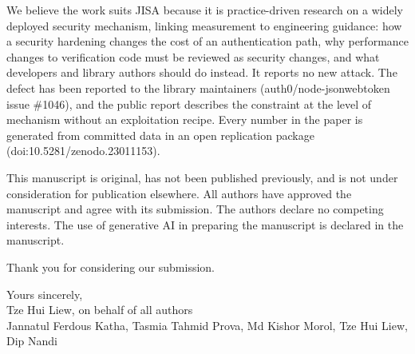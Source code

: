 \documentclass[11pt,a4paper]{article}
\begin{document}
We believe the work suits JISA because it is practice-driven research on a
widely deployed security mechanism, linking measurement to engineering
guidance: how a security hardening changes the cost of an authentication path,
why performance changes to verification code must be reviewed as security
changes, and what developers and library authors should do instead. It reports no new
attack. The defect has been reported to the library maintainers
(auth0/node-jsonwebtoken issue \#1046), and the public report describes the
constraint at the level of mechanism without an exploitation recipe. Every
number in the paper is generated from committed data in an open replication
package (doi:10.5281/zenodo.23011153).

This manuscript is original, has not been published previously, and is not
under consideration for publication elsewhere. All authors have approved the
manuscript and agree with its submission. The authors declare no competing
interests. The use of generative AI in preparing the manuscript is declared in
the manuscript.

Thank you for considering our submission.

\medskip
\noindent
Yours sincerely,\\[4pt]
Tze Hui Liew, on behalf of all authors\\
Jannatul Ferdous Katha, Tasmia Tahmid Prova, Md Kishor Morol, Tze Hui Liew,
Dip Nandi
\end{document}

